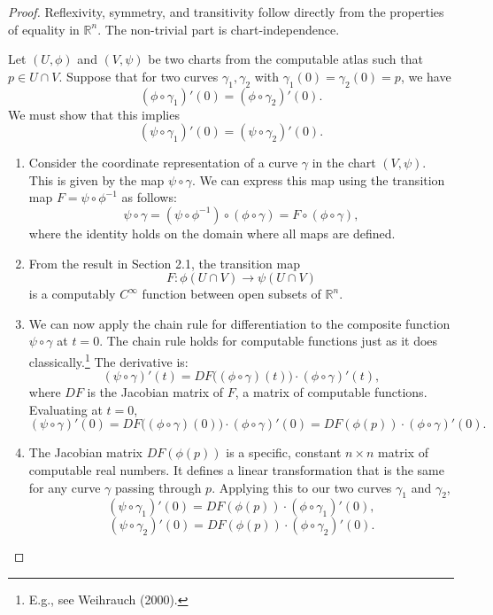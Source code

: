 \documentclass[12pt, a4paper]{article}
\begin{document}
\begin{proof}
Reflexivity, symmetry, and transitivity follow directly from the properties of equality in $\mathbb{R}^n$. The non-trivial part is chart-independence.

Let $(U, \phi)$ and $(V, \psi)$ be two charts from the computable atlas such that $p \in U \cap V$. Suppose that for two curves $\gamma_1, \gamma_2$ with $\gamma_1(0) = \gamma_2(0) = p$, we have
\[
(\phi \circ \gamma_1)'(0) = (\phi \circ \gamma_2)'(0).
\]
We must show that this implies
\[
(\psi \circ \gamma_1)'(0) = (\psi \circ \gamma_2)'(0).
\]

\begin{enumerate}
    \item Consider the coordinate representation of a curve $\gamma$ in the chart $(V, \psi)$. This is given by the map $\psi \circ \gamma$. We can express this map using the transition map $F = \psi \circ \phi^{-1}$ as follows:
    \[
    \psi \circ \gamma = (\psi \circ \phi^{-1}) \circ (\phi \circ \gamma) = F \circ (\phi \circ \gamma),
    \]
    where the identity holds on the domain where all maps are defined.

    \item From the result in Section 2.1, the transition map
    \[
    F: \phi(U \cap V) \to \psi(U \cap V)
    \]
    is a computably $C^\infty$ function between open subsets of $\mathbb{R}^n$.

    \item We can now apply the chain rule for differentiation to the composite function $\psi \circ \gamma$ at $t=0$. The chain rule holds for computable functions just as it does classically.\footnote{E.g., see Weihrauch (2000).}
    The derivative is:
    \[
    (\psi \circ \gamma)'(t) = DF\big( (\phi \circ \gamma)(t) \big) \cdot (\phi \circ \gamma)'(t),
    \]
    where $DF$ is the Jacobian matrix of $F$, a matrix of computable functions. Evaluating at $t=0$,
    \[
    (\psi \circ \gamma)'(0) = DF\big( (\phi \circ \gamma)(0) \big) \cdot (\phi \circ \gamma)'(0) = DF(\phi(p)) \cdot (\phi \circ \gamma)'(0).
    \]

    \item The Jacobian matrix $DF(\phi(p))$ is a specific, constant $n \times n$ matrix of computable real numbers. It defines a linear transformation that is the same for any curve $\gamma$ passing through $p$. Applying this to our two curves $\gamma_1$ and $\gamma_2$,
    \[
    (\psi \circ \gamma_1)'(0) = DF(\phi(p)) \cdot (\phi \circ \gamma_1)'(0),
    \]
    \[
    (\psi \circ \gamma_2)'(0) = DF(\phi(p)) \cdot (\phi \circ \gamma_2)'(0).
    \]


\end{enumerate}
\end{proof}
\end{document}
